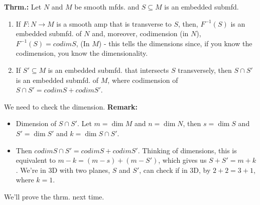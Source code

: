 \documentclass[12pt,letterpaper]{article}
\begin{document}
\textbf{Thrm.:} Let $N$ and $M$ be smooth mfds. and $S \subseteq M$ is an embedded submfd. 
\begin{enumerate}
    \item If $F: N \rightarrow M$ is a smooth amp that is transverse to $S$, then, $F^{-1}(S)$ is an embedded submfd. of $N$ and, moreover, codimension (in $N$), $F^{-1}(S) = codim S$, (In $M$) - this tells the dimensions since, if you know the codimension, you know the dimensionality.
    \item If $S' \subseteq M$ is an embedded submfd. that intersects $S$ transversely, then $S \cap S'$ is an embedded submfd. of $M$, where codimension of $S \cap S' = codim S + codim S' $.
\end{enumerate}
We need to check the dimension. \textbf{Remark:} 
\begin{itemize}
    \item Dimension of $S \cap S'$. Let $m = \dim M$ and $n = \dim N$, then $s =\dim S$ and $S' = \dim S'$ and $k = \dim S \cap S'$. 
    \item Then $codim S \cap S' = codim S+ codim S'$. Thinking of dimensions, this is equivalent to $m -k = (m-s) + (m - S')$, which gives us $S + S' = m+k$. We're in 3D with two planes, $S$ and $S'$, can check if in 3D, by $2 + 2 = 3 + 1$, where $k=1$. 
\end{itemize}

We'll prove the thrm. next time.
\end{document}
